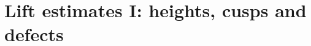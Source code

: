 \section{Lift estimates I: heights, cusps and defects}\label{sec:pf:lift1}

\providecommand{\liftonemainT}{\mathrm{mainT}}
\providecommand{\liftonemuc}{\mu_{\mathrm{core}}}
\providecommand{\liftonedfl}{d_{\mathrm{fl}}}
\providecommand{\liftonelogOm}{\log\Omega}
\providecommand{\liftonedefB}{\mathrm{defB}}
\providecommand{\liftoneflat}{\mathrm{fd}}
\providecommand{\liftonerd}{\mathrm{rd}}
\providecommand{\liftonecusp}{\mathcal S}
\providecommand{\liftonelat}{\Lambda}
\providecommand{\liftonehgt}{\mathrm{ht}}
\providecommand{\liftonedg}{\mathrm{dg}}
\providecommand{\liftonedegC}{\mathrm{deg}_{\mathrm{C}}}
\providecommand{\liftonerkC}{\mathrm{rk}_{\mathrm{C}}}
\providecommand{\liftonerk}{\operatorname{rk}}
\providecommand{\liftonevdm}{\mathrm{vdm}}
\providecommand{\liftoneerr}{\mathrm{err}}
\providecommand{\liftonebnd}{\mathrm{bnd}}
\providecommand{\liftonehtc}{\mathrm{htc}}
\providecommand{\liftonevol}{\mathrm{vol}}
\providecommand{\liftoneH}{\mathrm{Ht}}
\providecommand{\liftoneS}{\mathrm{Sh}}
\providecommand{\liftoneG}{\mathrm{Geo}}
\providecommand{\liftoneM}{\mathrm{Mlt}}
\providecommand{\liftoneB}{\mathrm{Bud}}
\providecommand{\liftoneP}{\mathrm{Pin}}
\providecommand{\liftoneR}{\mathrm{Shr}}
\providecommand{\liftoneHS}{\mathrm{HSB}}
\providecommand{\liftoneAnc}{\mathrm{Anc}}
\providecommand{\liftoneNw}{\mathcal N_{\mathrm{wt}}}
\providecommand{\liftoneNh}{\mathcal N_{\mathrm{host}}}
\providecommand{\liftoneDef}{\mathrm{Def}}
\providecommand{\liftoneFl}{\mathcal F}
\providecommand{\liftoneFib}{\mathrm{Fib}}
\providecommand{\liftoneeig}{\Lambda^{\chi}}
\providecommand{\liftoneHC}{\mathrm{HC}}

